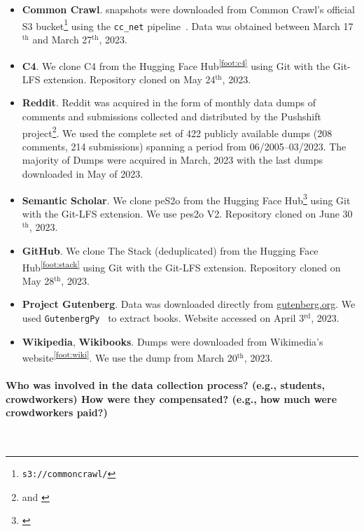 \documentclass{article}
\newcommand*{\fnref}[1]{\textsuperscript{\ref{#1}}}
\begin{document}
\begin{itemize}[leftmargin=1em]
    \item \textbf{Common Crawl}. snapshots were downloaded from Common Crawl's official S3 bucket\footnote{\texttt{s3://commoncrawl/}} using the \texttt{cc\_net} pipeline~\citep{wenzek-etal-2020-ccnet}. Data was obtained between March 17$^\textrm{th}$ and March 27$^\textrm{th}$, 2023.
    \item \textbf{C4}. We clone C4 from the Hugging Face Hub\fnref{foot:c4} using Git with the Git-LFS extension. Repository cloned on May 24$^\textrm{th}$, 2023.
    \item \textbf{Reddit}. Reddit was acquired in the form of monthly data dumps of  comments and submissions collected and distributed by the Pushshift project\footnote{\href{https://files.pushshift.io/reddit/submissions/}{} and \href{https://files.pushshift.io/reddit/comments/}{}}. We used the complete set of 422 publicly available dumps (208 comments, 214 submissions) spanning a period from 06/2005--03/2023. The majority of Dumps were acquired in March, 2023 with the last dumps downloaded in May of 2023.
    \item \textbf{Semantic Scholar}. We clone peS2o from the Hugging Face Hub\footnote{\href{https://huggingface.co/datasets/allenai/peS2o}{}} using Git with the Git-LFS extension. We use pes2o V2. Repository cloned on June 30$^\textrm{th}$, 2023.
    \item \textbf{GitHub}. We clone The Stack (deduplicated) from the Hugging Face Hub\fnref{foot:stack} using Git with the Git-LFS extension. Repository cloned on May 28$^\textrm{th}$, 2023.
    \item \textbf{Project Gutenberg}. Data was downloaded directly from \url{gutenberg.org}. We used \texttt{GutenbergPy}~\citep{GutenbergPy} to extract books. Website accessed on April 3$^\textrm{rd}$, 2023.
    \item \textbf{Wikipedia}, \textbf{Wikibooks}. Dumps were downloaded from Wikimedia's website\fnref{foot:wiki}. We use the dump from March 20$^\textrm{th}$, 2023.
\end{itemize}

\paragraph{Who was involved in the data collection process? (e.g., students, crowdworkers) How were they compensated? (e.g., how much were crowdworkers paid?)}~
\end{document}
